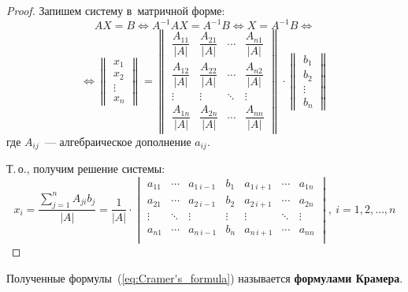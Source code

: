 \begin{proof}
Запишем систему в~матричной форме:
\begin{equation*}
AX = B \Leftrightarrow
A^{-1}AX = A^{-1}B \Leftrightarrow
X = A^{-1}B \Leftrightarrow
\end{equation*}
\begin{equation*}
\Leftrightarrow
\begin{Vmatrix}
x_1 \\
x_2 \\
\vdots \\
x_n
\end{Vmatrix} =
\begin{Vmatrix}
\dfrac{A_{11}}{|A|} & \dfrac{A_{21}}{|A|} & \cdots & \dfrac{A_{n1}}{|A|} \\
\dfrac{A_{12}}{|A|} & \dfrac{A_{22}}{|A|} & \cdots & \dfrac{A_{n2}}{|A|} \\
\vdots & \vdots & \ddots & \vdots \\
\dfrac{A_{1n}}{|A|} & \dfrac{A_{2n}}{|A|} & \cdots & \dfrac{A_{nn}}{|A|}
\end{Vmatrix} \cdot
\begin{Vmatrix}
b_1 \\
b_2 \\
\vdots \\
b_n
\end{Vmatrix}
\end{equation*}
где $A_{ij}$~--- алгебраическое дополнение $a_{ij}$.

Т.\,о., получим решение системы:
\begin{equation}
\label{eq:Cramer's_formula}
x_i = \frac{\displaystyle \sum_{j=1}^n A_{ji} b_j}{|A|} =
\frac1{{|A|}} \cdot
\begin{vmatrix}
a_{11} & \cdots & a_{1\, i-1} & b_{1} & a_{1\, i+1} & \cdots & a_{1n} \\
a_{21} & \cdots & a_{2\, i-1} & b_{2} & a_{2\, i+1} & \cdots & a_{2n} \\
\vdots & \ddots & \vdots & \vdots & \vdots & \ddots & \vdots \\
a_{n1} & \cdots & a_{n\, i-1} & b_{n} & a_{n\, i+1} & \cdots & a_{nn} \\
\end{vmatrix}, \ i = 1, 2, \ldots, n
\end{equation}
\end{proof}

Полученные формулы~(\ref*{eq:Cramer's_formula}) называется \textbf{формулами Крамера}.

